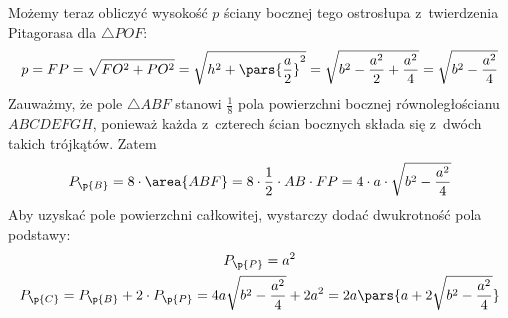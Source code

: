 Możemy teraz obliczyć wysokość \(p\) ściany bocznej tego ostrosłupa z~twierdzenia Pitagorasa dla \(\triangle{POF}\):
\begin{equation*}
    p = FP = \sqrt{FO^2 + PO^2}
    = \sqrt{h^2 + \pars{\frac{a}{2}}^2}
    = \sqrt{b^2 - \frac{a^2}{2} + \frac{a^2}{4}}
    = \sqrt{b^2 - \frac{a^2}{4}}
\end{equation*}
Zauważmy, że pole \(\triangle{ABF}\) stanowi \(\frac{1}{8}\) pola powierzchni bocznej równoległościanu \(ABCDEFGH\), ponieważ każda z~czterech ścian bocznych składa się z~dwóch takich trójkątów. Zatem
\begin{equation*}
    P_\p{B}
    = 8 \cdot \area{ABF}
    = 8 \cdot \frac{1}{2} \cdot AB \cdot FP
    = 4 \cdot a \cdot \sqrt{b^2 - \frac{a^2}{4}}
\end{equation*}
Aby uzyskać pole powierzchni całkowitej, wystarczy dodać dwukrotność pola podstawy:
\begin{gather*}
    P_\p{P} = a^2\\
    P_\p{C}
    = P_\p{B} + 2 \cdot P_\p{P}
    = 4a\sqrt{b^2 - \frac{a^2}{4}} + 2a^2
    = 2a\pars{a + 2\sqrt{b^2 - \frac{a^2}{4}}}
\end{gather*}
